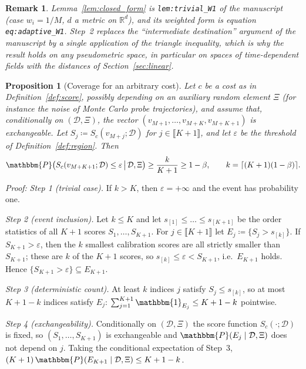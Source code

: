 \documentclass{article}
\newcommand{\RR}{\mathbb{R}}
\newcommand{\cD}{\mathcal{D}}                       %
\newcommand{\Sc}{S_c}                               %
\theoremstyle{plain}
\newtheorem{proposition}{Proposition}
\newtheorem{remark}{Remark}
\begin{document}
\begin{remark}
Lemma~\ref{lem:closed_form} is \texttt{lem:trivial\_W1} of the manuscript (case
$w_i=1/M$, $d$ a metric on $\RR^d$), and its weighted form is equation
\texttt{eq:adaptive\_W1}. Step~2 replaces the ``intermediate destination'' argument of the
manuscript by a single application of the triangle inequality, which is why the result holds
on any pseudometric space, in particular on spaces of time-dependent fields with the
distances of Section~\ref{sec:linear}.
\end{remark}

\begin{proposition}[Coverage for an arbitrary cost]\label{pr:coverage}
Let $c$ be a cost as in Definition~\ref{def:score}, possibly depending on an auxiliary random
element $\Xi$ (for instance the noise of Monte Carlo probe trajectories), and assume that,
conditionally on $(\cD,\Xi)$, the vector $(v_{M+1},\dots,v_{M+K},v_{M+K+1})$ is exchangeable.
Let $S_j\coloneqq\Sc(v_{M+j};\cD)$ for $j\in\llbracket K+1\rrbracket$, and let $\varepsilon$ be
the threshold of Definition~\ref{def:region}. Then
\[
  \mathbbm{P}\big(\Sc(v_{M+K+1};\cD)\leq\varepsilon\,\big|\,\cD,\Xi\big)\geq\frac{k}{K+1}\geq1-\beta,
  \qquad k=\lceil(K+1)(1-\beta)\rceil .
\]
\end{proposition}
\textit{Proof:}
\emph{Step 1 (trivial case).} If $k>K$, then $\varepsilon=+\infty$ and the event has
probability one.

\emph{Step 2 (event inclusion).} Let $k\leq K$ and let $s_{[1]}\leq\dots\leq s_{[K+1]}$ be the
order statistics of all $K+1$ scores $S_1,\dots,S_{K+1}$. For $j\in\llbracket K+1\rrbracket$ let
$E_j\coloneqq\{S_j>s_{[k]}\}$. If $S_{K+1}>\varepsilon$, then the $k$ smallest calibration
scores are all strictly smaller than $S_{K+1}$; these are $k$ of the $K+1$ scores, so
$s_{[k]}\leq\varepsilon<S_{K+1}$, i.e.\ $E_{K+1}$ holds. Hence
$\{S_{K+1}>\varepsilon\}\subseteq E_{K+1}$.

\emph{Step 3 (deterministic count).} At least $k$ indices $j$ satisfy $S_j\leq s_{[k]}$, so at
most $K+1-k$ indices satisfy $E_j$: $\sum_{j=1}^{K+1}\mathbbm{1}_{E_j}\leq K+1-k$ pointwise.

\emph{Step 4 (exchangeability).} Conditionally on $(\cD,\Xi)$ the score function $\Sc(\cdot;\cD)$
is fixed, so $(S_1,\dots,S_{K+1})$ is exchangeable and $\mathbbm{P}(E_j\mid\cD,\Xi)$ does not
depend on $j$. Taking the conditional expectation of Step~3,
$(K+1)\,\mathbbm{P}(E_{K+1}\mid\cD,\Xi)\leq K+1-k$.
\end{document}
